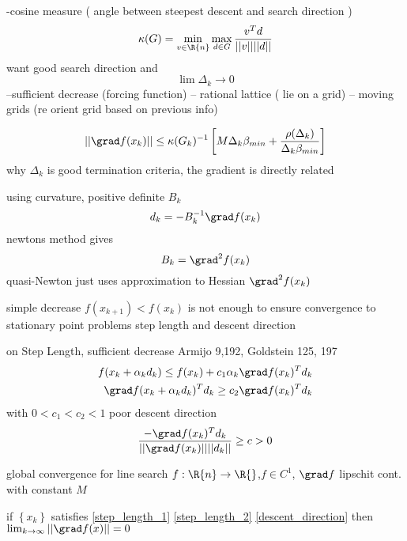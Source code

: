 -cosine measure ( angle between steepest descent and search direction )
\begin{equation}
\kappa (G) = \min_{v \in \R{n}}   \max_{d \in G}   \frac{v^T d}{||v|| ||d||}
\end{equation}
want good search direction and
\begin{equation}
\lim \Delta_k \rightarrow 0
\end{equation}
--sufficient decrease (forcing function)
-- rational lattice ( lie on a grid)
-- moving grids (re orient grid based on previous info)

\begin{equation}
|| \grad f (x_k) || \le \kappa (G_k)^{-1} \left[ M \Delta_k \beta_{min} + \frac{\rho (\Delta_k)}{\Delta_k \beta_{min}}\right]
\end{equation}
why $\Delta_k$ is good termination criteria, the gradient is directly related

using curvature, positive definite $B_k$
\begin{equation}
d_k = - B_k^{-1} \grad f (x_k)
\end{equation}
newtons method gives
\begin{equation}
B_k = \grad^2 f(x_k)
\end{equation}
quasi-Newton just uses approximation to Hessian $\grad^2 f(x_k)$

simple decrease $f (x_{k+1} ) < f(x_k)$ is not enough to ensure convergence to stationary point
problems step length and descent direction

on Step Length, sufficient decrease Armijo 9,192, Goldstein 125, 197
\begin{align}
f(x_k + \alpha_k d_k) \le f(x_k) + c_1 \alpha_k \grad f(x_k)^T d_k  \label{step_length_1}\\
\grad f (x_k + \alpha_k d_k)^T d_k \ge c_2 \grad f(x_k)^T d_k \label{step_length_2}
\end{align}
with $0 < c_1 < c_2 < 1$
poor descent direction
\begin{equation}\label{descent_direction}
\frac{-\grad f(x_k)^T d_k}{|| \grad f (x_k) || ||d_k|| } \ge c > 0
\end{equation}


global convergence for line search
$f: \R{n} \rightarrow \R{}$,$f \in C^1$, $\grad f$ lipschit cont. with constant $M$

if $\left\{x_k\right\}$ satisfies \ref{step_length_1} \ref{step_length_2} \ref{descent_direction}
then $\lim_{k\rightarrow \infty } || \grad f(x) || = 0$

